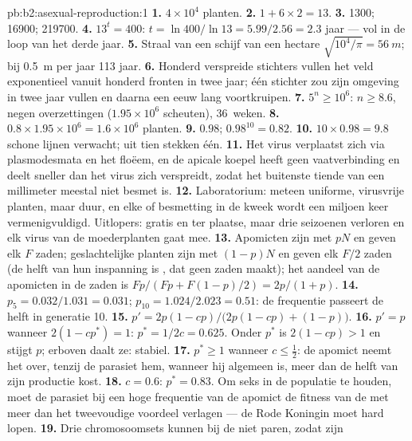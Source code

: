 \begin{solution}{pb:b2:asexual-reproduction:1}
\textbf{1.} $4\times 10^{4}$ planten.
\textbf{2.} $1 + 6\times 2 = 13$.
\textbf{3.} \num{1300}; \num{16900}; \num{219700}.
\textbf{4.} $13^{t} = 400$: $t = \ln 400/\ln 13 = 5.99/2.56 = 2.3$
jaar --- vol in de loop van het derde jaar.
\textbf{5.} Straal van een schijf van een hectare $\sqrt{10^{4}/\pi} = \qty{56}{m}$;
bij \qty{0.5}{m} per jaar \num{113} jaar.
\textbf{6.} Honderd verspreide stichters vullen het veld exponentieel
vanuit honderd fronten in twee jaar; één stichter zou zijn omgeving in
twee jaar vullen en daarna een eeuw lang voortkruipen.
\textbf{7.} $5^{n} \ge 10^{6}$: $n \ge 8.6$, negen overzettingen
($1.95\times 10^{6}$ scheuten), 36~weken.
\textbf{8.} $0.8\times 1.95\times 10^{6} = 1.6\times 10^{6}$ planten.
\textbf{9.} $0.98$; $0.98^{10} = 0.82$.
\textbf{10.} $10\times 0.98 = 9.8$ schone lijnen verwacht; uit tien
stekken één.
\textbf{11.} Het virus verplaatst zich via plasmodesmata en het floëem, en
de apicale koepel heeft geen vaatverbinding en deelt sneller dan het virus
zich verspreidt, zodat het buitenste tiende van een millimeter meestal
niet besmet is.
\textbf{12.} Laboratorium: meteen uniforme, virusvrije planten, maar duur,
en elke  of besmetting in de kweek wordt een miljoen keer
vermenigvuldigd. Uitlopers: gratis en ter plaatse, maar drie seizoenen
verloren en elk virus van de moederplanten gaat mee.
\textbf{13.} Apomicten zijn met $pN$ en geven elk $F$ zaden; geslachtelijke
planten zijn met $(1 - p)N$ en geven elk $F/2$ zaden (de helft van hun
inspanning is , dat geen zaden maakt); het aandeel van de
apomicten in de zaden is $Fp/(Fp + F(1 - p)/2)
= 2p/(1 + p)$.
\textbf{14.} $p_5 = 0.032/1.031 = 0.031$; $p_{10} = 1.024/2.023 =
0.51$: de frequentie passeert de helft in generatie 10.
\textbf{15.} $p' = 2p(1 - cp)/\bigl(2p(1 - cp) + (1 - p)\bigr)$.
\textbf{16.} $p' = p$ wanneer $2(1 - cp^*) = 1$: $p^* = 1/2c = 0.625$.
Onder $p^*$ is $2(1 - cp) > 1$ en stijgt $p$; erboven daalt ze: stabiel.
\textbf{17.} $p^* \ge 1$ wanneer $c \le \tfrac12$: de apomict neemt het
over, tenzij de parasiet hem, wanneer hij algemeen is, meer dan de helft
van zijn productie kost.
\textbf{18.} $c = 0.6$: $p^* = 0.83$. Om seks in de populatie te houden,
moet de parasiet bij een hoge frequentie van de apomict de fitness van de
 met meer dan het tweevoudige voordeel verlagen --- de Rode Koningin
moet hard lopen.
\textbf{19.} Drie chromosoomsets kunnen bij de  niet paren, zodat zijn

\end{solution}

